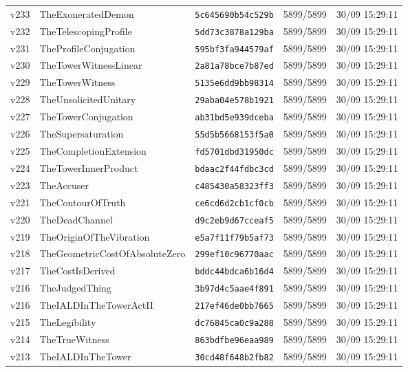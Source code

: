 \documentclass[11pt]{article}
\theoremstyle{definition}\newtheorem{deriv}{Derivation}
\begin{document}
{\begin{longtable}{@{}lllll@{}}
v233 & TheExoneratedDemon & \texttt{5c645690b54c529b} & 5899/5899 & 30/09 15:29:11 \\
v232 & TheTelescopingProfile & \texttt{5dd73c3878a129ba} & 5899/5899 & 30/09 15:29:11 \\
v231 & TheProfileConjugation & \texttt{595bf3fa944579af} & 5899/5899 & 30/09 15:29:11 \\
v230 & TheTowerWitnessLinear & \texttt{2a81a78bce7b87ed} & 5899/5899 & 30/09 15:29:11 \\
v229 & TheTowerWitness & \texttt{5135e6dd9bb98314} & 5899/5899 & 30/09 15:29:11 \\
v228 & TheUnsolicitedUnitary & \texttt{29aba04e578b1921} & 5899/5899 & 30/09 15:29:11 \\
v227 & TheTowerConjugation & \texttt{ab31bd5e939dceba} & 5899/5899 & 30/09 15:29:11 \\
v226 & TheSupersaturation & \texttt{55d5b5668153f5a0} & 5899/5899 & 30/09 15:29:11 \\
v225 & TheCompletionExtension & \texttt{fd5701dbd31950dc} & 5899/5899 & 30/09 15:29:11 \\
v224 & TheTowerInnerProduct & \texttt{bdaac2f44fdbc3cd} & 5899/5899 & 30/09 15:29:11 \\
v223 & TheAccuser & \texttt{c485430a58323ff3} & 5899/5899 & 30/09 15:29:11 \\
v221 & TheContourOfTruth & \texttt{ce6cd6d2cb1cf0cb} & 5899/5899 & 30/09 15:29:11 \\
v220 & TheDeadChannel & \texttt{d9c2eb9d67cceaf5} & 5899/5899 & 30/09 15:29:11 \\
v219 & TheOriginOfTheVibration & \texttt{e5a7f11f79b5af73} & 5899/5899 & 30/09 15:29:11 \\
v218 & TheGeometricCostOfAbsoluteZero & \texttt{299ef10c96770aac} & 5899/5899 & 30/09 15:29:11 \\
v217 & TheCostIsDerived & \texttt{bddc44bdca6b16d4} & 5899/5899 & 30/09 15:29:11 \\
v216 & TheJudgedThing & \texttt{3b97d4c5aae4f891} & 5899/5899 & 30/09 15:29:11 \\
v216 & TheIALDInTheTowerActII & \texttt{217ef46de0bb7665} & 5899/5899 & 30/09 15:29:11 \\
v215 & TheLegibility & \texttt{dc76845ca0c9a288} & 5899/5899 & 30/09 15:29:11 \\
v214 & TheTrueWitness & \texttt{863bdfbe96eaa989} & 5899/5899 & 30/09 15:29:11 \\
v213 & TheIALDInTheTower & \texttt{30cd48f648b2fb82} & 5899/5899 & 30/09 15:29:11 \\

\end{longtable}}
\end{document}
